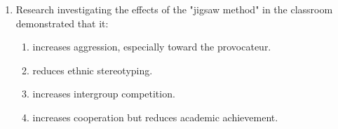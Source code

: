 \documentclass[12pt]{article}
\begin{document}
\begin{enumerate}[label=\arabic*.]
\begin{enumerate}[label=(\alph*)]
    \item oval of a positive reinforcer
    \item differential reinforcement
    \item negative reinforcement
    \item stimulus generalization
\end{enumerate}
\item Research investigating the effects of the "jigsaw method" in the classroom demonstrated that it:
\begin{enumerate}[label=(\alph*)]
    \item increases aggression, especially toward the provocateur.
    \item reduces ethnic stereotyping.
    \item increases intergroup competition.
    \item increases cooperation but reduces academic achievement.
\end{enumerate}
\end{enumerate}
\end{document}
